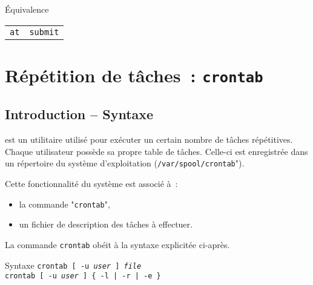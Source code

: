 \begin{definition}{\'{E}quivalence}
\begin{center}
\begin{tabular}{|c|c|}
	\hline
		{\Unix}		&	{\OpenVMS}			\\
	\hline \hline
		{\tt at}		&	{\tt submit}			\\
	\hline
\end{tabular}
\end{center}
\end{definition}

\section{R{\'e}p{\'e}tition de t{\^a}ches~: {\tt crontab}}

\subsection{Introduction -- Syntaxe}

 est un utilitaire utilis{\'e} pour ex{\'e}cuter un certain nombre de t{\^a}ches
r{\'e}p{\'e}titives. Chaque utilisateur poss{\`e}de sa propre table de t{\^a}ches. Celle-ci est
enregistr{\'e}e dans un r{\'e}pertoire du syst{\`e}me d'exploitation ({\tt /var/spool/crontab}").

Cette fonctionnalit{\'e} du syst{\`e}me est associ{\'e} {\`a}~:
\begin{itemize}
	\item	la commande "{\tt crontab}",
	\item	un fichier de description des t{\^a}ches {\`a} effectuer.
\end{itemize}

La commande {\tt crontab} ob{\'e}it {\`a} la syntaxe explicit{\'e}e ci-apr{\`e}s.

\begin{definition}{Syntaxe}
{\tt crontab [ -u {\sl user} ] {\sl file}}\\
{\tt crontab [ -u {\sl user} ] \{ -l | -r | -e \}}
\end{definition}

